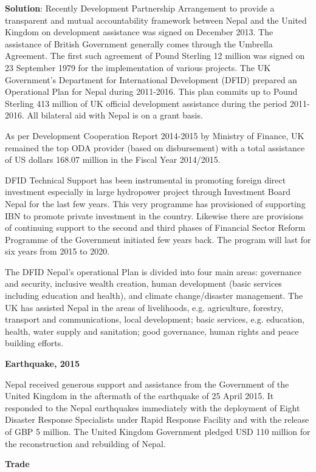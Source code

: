 \documentclass[
  openany]{book}
\newenvironment{solution}{ {\bfseries Solution}:}{}
\begin{document}
\begin{solution}
Recently Development Partnership Arrangement to provide a transparent and mutual accountability framework between Nepal and the United Kingdom on development assistance was signed on December 2013. The assistance of British Government generally comes through the Umbrella Agreement. The first such agreement of Pound Sterling 12 million was signed on 23 September 1979 for the implementation of various projects. The UK Government’s Department for International Development (DFID) prepared an Operational Plan for Nepal during 2011-2016. This plan commits up to Pound Sterling 413 million of UK official development assistance during the period 2011-2016. All bilateral aid with Nepal is on a grant basis.

As per Development Cooperation Report 2014-2015 by Ministry of Finance, UK remained the top ODA provider (based on disbursement) with a total assistance of US dollars 168.07 million in the Fiscal Year 2014/2015.

DFID Technical Support has been instrumental in promoting foreign direct investment especially in large hydropower project through Investment Board Nepal for the last few years. This very programme has provisioned of supporting IBN to promote private investment in the country. Likewise there are provisions of continuing support to the second and third phases of Financial Sector Reform Programme of the Government initiated few years back. The program will last for six years from 2015 to 2020.

The DFID Nepal's operational Plan is divided into four main areas: governance and security, inclusive wealth creation, human development (basic services including education and health), and climate change/disaster management. The UK has assisted Nepal in the areas of livelihoods, e.g. agriculture, forestry, transport and communications, local development; basic services, e.g. education, health, water supply and sanitation; good governance, human rights and peace building efforts.

\textbf{Earthquake, 2015}

Nepal received generous support and assistance from the Government of the United Kingdom in the aftermath of the earthquake of 25 April 2015. It responded to the Nepal earthquakes immediately with the deployment of Eight Disaster Response Specialists under Rapid Response Facility and with the release of GBP 5 million. The United Kingdom Government pledged USD 110 million for the reconstruction and rebuilding of Nepal. 

\textbf{Trade}


\end{solution}
\end{document}
